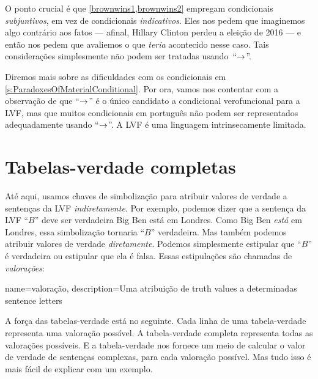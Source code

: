 O ponto crucial é que \cref*{brownwins1,brownwins2} empregam condicionais \emph{subjuntivos}, em vez de condicionais \emph{indicativos}. Eles nos pedem que imaginemos algo contrário aos fatos — afinal, Hillary Clinton perdeu a eleição de 2016 — e então nos pedem que avaliemos o que \emph{teria} acontecido nesse caso. Tais considerações simplesmente não podem ser tratadas usando~\textquotedblleft{}$\rightarrow$\textquotedblright{}.

Diremos mais sobre as dificuldades com os condicionais em \cref{s:ParadoxesOfMaterialConditional}. Por ora, vamos nos contentar com a observação de que \textquotedblleft{}$\rightarrow$\textquotedblright{} é o único candidato a condicional verofuncional para a LVF, mas que muitos condicionais em português não podem ser representados adequadamente usando \textquotedblleft{}$\rightarrow$\textquotedblright{}. A LVF é uma linguagem intrinsecamente limitada.

\chapter{Tabelas-verdade completas}
\label{s:CompleteTruthTables}

Até aqui, usamos chaves de simbolização para atribuir valores de verdade a sentenças da LVF \emph{indiretamente}. Por exemplo, podemos dizer que a sentença da LVF \textquotedblleft{}$B$\textquotedblright{} deve ser verdadeira \ifeff{} Big Ben está em Londres. Como Big Ben \emph{está} em Londres, essa simbolização tornaria \textquotedblleft{}$B$\textquotedblright{} verdadeira. Mas também podemos atribuir valores de verdade \emph{diretamente}. Podemos simplesmente estipular que \textquotedblleft{}$B$\textquotedblright{} é verdadeira ou estipular que ela é falsa. Essas estipulações são chamadas de \emph{valorações}:

{
name=valoração,
description={Uma atribuição de \glspl{truth value} a determinadas \glspl{sentence letter}}
}

A força das tabelas-verdade está no seguinte. Cada linha de uma tabela-verdade representa uma valoração possível. A tabela-verdade completa representa todas as valorações possíveis. E a tabela-verdade nos fornece um meio de calcular o valor de verdade de sentenças complexas, para cada valoração possível. Mas tudo isso é mais fácil de explicar com um exemplo.

